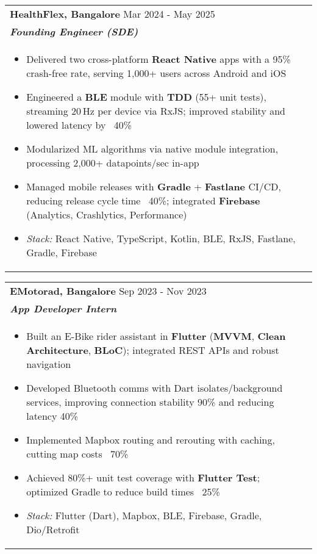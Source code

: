\documentclass[a4paper,8pt]{article}
\begin{document}
\begin{tabularx}{\linewidth}{ @{}l r@{} }
\textbf{{HealthFlex, Bangalore}} \hfill \color[HTML]{371e77} Mar 2024 - May 2025 \\[4pt]
\color[HTML]{371e77}\textbf{\textit{Founding Engineer (SDE)}}\ \hfill \color[HTML]{4B28A4} \\[5pt]
\begin{minipage}[t]{\linewidth}
    \begin{itemize}[nosep,after=\strut, leftmargin=2em, itemsep=2pt]
        \item Delivered two cross-platform \textbf{React Native} apps with a 95\% crash-free rate, serving 1,000+ users across Android and iOS
        \item Engineered a \textbf{BLE} module with \textbf{TDD} (55+ unit tests), streaming 20\,Hz per device via RxJS; improved stability and lowered latency by ~40\%
        \item Modularized ML algorithms via native module integration, processing 2,000+ datapoints/sec in-app
        \item Managed mobile releases with \textbf{Gradle} + \textbf{Fastlane} CI/CD, reducing release cycle time ~40\%; integrated \textbf{Firebase} (Analytics, Crashlytics, Performance)
        \item \textit{Stack:} React Native, TypeScript, Kotlin, BLE, RxJS, Fastlane, Gradle, Firebase
    \end{itemize}
\end{minipage}
\end{tabularx}

\begin{tabularx}{\linewidth}{ @{}l r@{} }
\textbf{{EMotorad, Bangalore}} \hfill \color[HTML]{371e77} Sep 2023 - Nov 2023 \\[4pt]
\color[HTML]{371e77}\textbf{\textit{App Developer Intern}}\ \hfill \color[HTML]{4B28A4} \\[5pt]
\begin{minipage}[t]{\linewidth}
    \begin{itemize}[nosep,after=\strut, leftmargin=2em, itemsep=2pt]
        \item Built an E-Bike rider assistant in \textbf{Flutter} (\textbf{MVVM}, \textbf{Clean Architecture}, \textbf{BLoC}); integrated REST APIs and robust navigation
        \item Developed Bluetooth comms with Dart isolates/background services, improving connection stability 90\% and reducing latency 40\%
        \item Implemented Mapbox routing and rerouting with caching, cutting map costs ~70\%
        \item Achieved 80\%+ unit test coverage with \textbf{Flutter Test}; optimized Gradle to reduce build times ~25\%
        \item \textit{Stack:} Flutter (Dart), Mapbox, BLE, Firebase, Gradle, Dio/Retrofit
    \end{itemize}
\end{minipage}
\end{tabularx}
\end{document}
